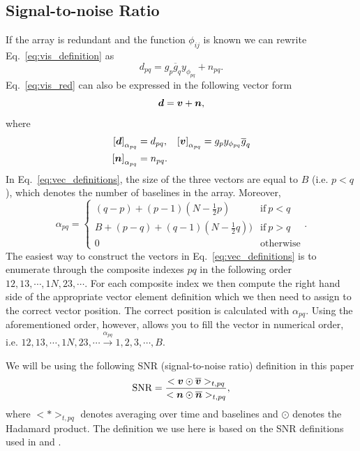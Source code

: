 \documentclass[useAMS,usenatbib]{mn2e}
\newcommand{\bd}{\bmath{d}}
\newcommand{\bv}{\bmath{v}}
\newcommand{\bn}{\bmath{n}}
\newcommand{\conj}[1]{\overline{#1}}
\begin{document}
\subsection{Signal-to-noise Ratio}
If the array is redundant and the function $\phi_{ij}$ is known we can rewrite Eq.~\eqref{eq:vis_definition} as
\begin{equation}
\label{eq:vis_red}
d_{pq} = g_{p}\conj{g}_{q}y_{\phi_{pq}} + n_{pq}.
\end{equation}
Eq.~\eqref{eq:vis_red} can also be expressed in the following vector form 
\begin{equation}
\bd = \bv + \bn, 
\end{equation}
where 
\begin{align}
 \left [ \bd \right]_{\alpha_{pq}} &= d_{pq}, & \left [ \bv \right ]_{\alpha_{pq}} &= g_p y_{\phi_{pq}} \conj{g}_q\nonumber\\
 \left [ \bn \right ]_{\alpha_{pq}} &= n_{pq}. &  &\label{eq:vec_definitions}
\end{align}
In Eq.~\eqref{eq:vec_definitions}, the size of the three vectors are equal to $B$ (i.e. $p<q$), which denotes the number of baselines in the array. Moreover,
\begin{equation}
\alpha_{pq} =
\begin{cases}
(q-p) + (p-1)\left (N-\frac{1}{2}p \right ) & \textrm{if}~p<q\\
B + (p-q) + (q-1)\left (N-\frac{1}{2}q \right )) & \textrm{if}~p>q\\
0 & \textrm{otherwise}
\end{cases}.
\end{equation}
The easiest way to construct the vectors in Eq.~\ref{eq:vec_definitions} is to enumerate through the composite indexes $pq$ in the following order $12, 13,\cdots,1N,23,\cdots$.
For each composite index we then compute the right hand side of the appropriate vector element definition which we then need to assign to the 
correct vector position. The correct position is calculated with $\alpha_{pq}$. Using the aforementioned order, however, allows you to fill the vector in numerical order, i.e. $12,13,\cdots,1N,23,\cdots \xrightarrow{\alpha_{pq}} 1,2,3,\cdots,B$.  


We will be using the following SNR (signal-to-noise ratio) definition in this paper  
\begin{equation}
\textrm{SNR} = \frac{<\bv\odot\conj{\bv}>_{t,pq}}{<\bn\odot\conj{\bn}>_{t,pq}}, 
\end{equation}
where $<*>_{t,pq}$ denotes averaging over time and baselines and $\odot$ denotes the Hadamard product. The definition we use here is based on the SNR definitions used in \citet{Liu2010} and \citet{Marthi2014}.
\end{document}
